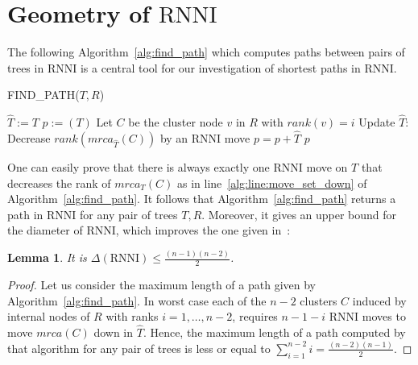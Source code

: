 \documentclass[11pt, a4paper]{article}
\newcommand{\rnni}{\mathrm{RNNI}}
\newtheorem{lemma}[definition]{Lemma}
\begin{document}





\section{Geometry of $\rnni$}

The following Algorithm~\ref{alg:find_path} which computes paths between pairs of trees in $\rnni$ is a central tool for our investigation of shortest paths in $\rnni$.

\begin{algorithm}[H]
\caption{FIND\_PATH($T,R$)}
\label{alg:find_path}
\begin{algorithmic}[1]
	\STATE $\hat{T} := T$
	\STATE $p := (T)$
		\STATE Let $C$ be the cluster node $v$ in $R$ with $rank(v) = i$
			\STATE Update $\hat{T}$: Decrease $rank(mrca_{\hat{T}}(C))$ by an $\rnni$ move \label{alg:line:move_set_down}
			\STATE $p = p+\hat{T}$
		\ENDWHILE
	\ENDFOR
	\RETURN $p$
\end{algorithmic}
\end{algorithm}


One can easily prove that there is always exactly one $\rnni$ move on $T$ that decreases the rank of $mrca_T(C)$ as in line~\ref{alg:line:move_set_down} of Algorithm~\ref{alg:find_path}.
It follows that Algorithm~\ref{alg:find_path} returns a path in $\rnni$ for any pair of trees $T,R$.
Moreover, it gives an upper bound for the diameter of $\rnni$, which improves the one given in~\cite{Gavryushkin2017}:

\begin{lemma}
    It is $\Delta(\rnni) \leq \frac{(n-1)(n-2)}{2}$.
\end{lemma}

\begin{proof}
    Let us consider the maximum length of a path given by Algorithm~\ref{alg:find_path}.
    In worst case each of the $n-2$ clusters $C$ induced by internal nodes of $R$ with ranks $i = 1, \dots, n-2$, requires $n-1-i$ $\rnni$ moves to move $mrca(C)$ down in $\hat{T}$.
	Hence, the maximum length of a path computed by that algorithm for any pair of trees is less or equal to $\sum\limits_{i = 1}^{n-2} i = \frac{(n-2)(n-1)}{2}$.
\end{proof}
\end{document}
